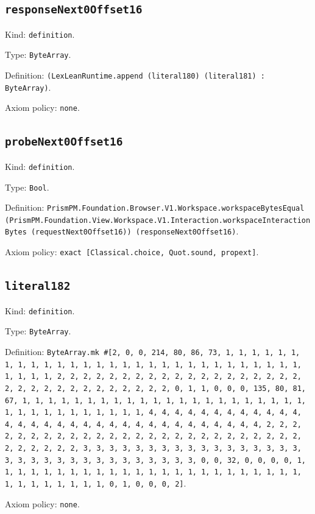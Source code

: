 \documentclass[11pt]{article}
\begin{document}
\subsection*{\texttt{responseNext0Offset16}}
\noindent Kind: \texttt{definition}.\par
\noindent Type: \texttt{ByteArray}.\par
\noindent Definition: \texttt{(LexLeanRuntime.append (literal180) (literal181) : ByteArray)}.\par
\noindent Axiom policy: \texttt{none}.\par
\subsection*{\texttt{probeNext0Offset16}}
\noindent Kind: \texttt{definition}.\par
\noindent Type: \texttt{Bool}.\par
\noindent Definition: \texttt{PrismPM.Foundation.Browser.V1.Workspace.workspaceBytesEqual (PrismPM.Foundation.View.Workspace.V1.Interaction.workspaceInteractionBytes (requestNext0Offset16)) (responseNext0Offset16)}.\par
\noindent Axiom policy: \texttt{exact [Classical.choice, Quot.sound, propext]}.\par
\subsection*{\texttt{literal182}}
\noindent Kind: \texttt{definition}.\par
\noindent Type: \texttt{ByteArray}.\par
\noindent Definition: \texttt{ByteArray.mk \#[2, 0, 0, 214, 80, 86, 73, 1, 1, 1, 1, 1, 1, 1, 1, 1, 1, 1, 1, 1, 1, 1, 1, 1, 1, 1, 1, 1, 1, 1, 1, 1, 1, 1, 1, 1, 1, 1, 1, 1, 2, 2, 2, 2, 2, 2, 2, 2, 2, 2, 2, 2, 2, 2, 2, 2, 2, 2, 2, 2, 2, 2, 2, 2, 2, 2, 2, 2, 2, 2, 2, 2, 0, 1, 1, 0, 0, 0, 135, 80, 81, 67, 1, 1, 1, 1, 1, 1, 1, 1, 1, 1, 1, 1, 1, 1, 1, 1, 1, 1, 1, 1, 1, 1, 1, 1, 1, 1, 1, 1, 1, 1, 1, 1, 1, 4, 4, 4, 4, 4, 4, 4, 4, 4, 4, 4, 4, 4, 4, 4, 4, 4, 4, 4, 4, 4, 4, 4, 4, 4, 4, 4, 4, 4, 4, 4, 4, 2, 2, 2, 2, 2, 2, 2, 2, 2, 2, 2, 2, 2, 2, 2, 2, 2, 2, 2, 2, 2, 2, 2, 2, 2, 2, 2, 2, 2, 2, 2, 2, 3, 3, 3, 3, 3, 3, 3, 3, 3, 3, 3, 3, 3, 3, 3, 3, 3, 3, 3, 3, 3, 3, 3, 3, 3, 3, 3, 3, 3, 3, 3, 3, 0, 0, 32, 0, 0, 0, 0, 1, 1, 1, 1, 1, 1, 1, 1, 1, 1, 1, 1, 1, 1, 1, 1, 1, 1, 1, 1, 1, 1, 1, 1, 1, 1, 1, 1, 1, 1, 1, 1, 0, 1, 0, 0, 0, 2]}.\par
\noindent Axiom policy: \texttt{none}.\par
\end{document}
